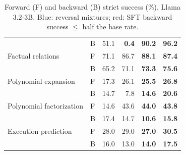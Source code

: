 \begin{table}[!t]
\begin{tabular}{llrrrr}
 & B & 51.1 & \textcolor{red!70!black}{\textbf{0.4}} & \textcolor{blue!60!black}{\textbf{90.2}} & \textcolor{blue!60!black}{\textbf{96.2}} \\
\addlinespace[2pt]
Factual relations & F & 71.1 & 86.7 & \textcolor{blue!60!black}{\textbf{88.1}} & \textcolor{blue!60!black}{\textbf{87.4}} \\
 & B & 65.2 & 71.1 & \textcolor{blue!60!black}{\textbf{73.3}} & \textcolor{blue!60!black}{\textbf{75.6}} \\
\addlinespace[2pt]
Polynomial expansion & F & 17.3 & 26.1 & \textcolor{blue!60!black}{\textbf{25.5}} & \textcolor{blue!60!black}{\textbf{26.8}} \\
 & B & 14.7 & 7.8 & \textcolor{blue!60!black}{\textbf{14.6}} & \textcolor{blue!60!black}{\textbf{20.6}} \\
\addlinespace[2pt]
Polynomial factorization & F & 14.6 & 43.6 & \textcolor{blue!60!black}{\textbf{44.0}} & \textcolor{blue!60!black}{\textbf{43.8}} \\
 & B & 17.4 & 14.7 & \textcolor{blue!60!black}{\textbf{10.6}} & \textcolor{blue!60!black}{\textbf{15.8}} \\
\addlinespace[2pt]
Execution prediction & F & 28.0 & 29.0 & \textcolor{blue!60!black}{\textbf{27.0}} & \textcolor{blue!60!black}{\textbf{30.5}} \\
 & B & 16.0 & 13.0 & \textcolor{blue!60!black}{\textbf{14.0}} & \textcolor{blue!60!black}{\textbf{17.5}} \\
\bottomrule
\end{tabular}
\caption{Forward (F) and backward (B) strict success (\%), Llama 3.2-3B. Blue: reversal mixtures; red: SFT backward success $\leq$ half the base rate.}\label{tab:main-adaptations}
\end{table}
